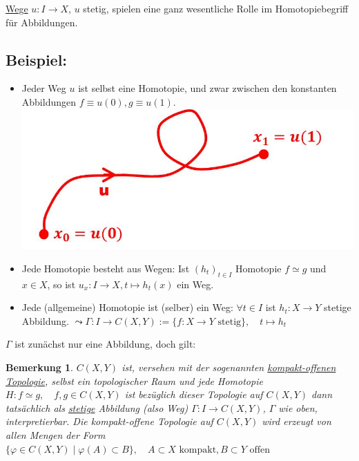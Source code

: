 \documentclass[a4paper,11pt,notitlepage]{report}
\newtheorem{remark}{Bemerkung}[chapter]
\newenvironment{bsp}[1]
{
\setlength{\fboxsep}{10pt}
\subsection*{Beispiel: #1}
\begin{upshape}
}
{
\end{upshape}
}
\begin{document}
\underline{Wege} $u \colon I \rightarrow X$, $u$ stetig, spielen eine ganz wesentliche Rolle im Homotopiebegriff für Abbildungen.

\begin{bsp}{}
	\begin{itemize}
		\item Jeder Weg $u$ ist selbst eine Homotopie, und zwar zwischen den konstanten Abbildungen $f \equiv u(0), g \equiv u(1)$.
			\newline \includegraphics[scale=0.4]{images/Weg_als_Homotopie.jpg}
		\item Jede Homotopie besteht aus Wegen:
			\newline Ist $(h_t)_{t \in I}$ Homotopie $f \simeq g$ und $x \in X$, so ist 
			$u_x \colon I \rightarrow X, t \mapsto h_t(x)$ ein Weg.
		\item Jede (allgemeine) Homotopie ist (selber) ein Weg: \newline
		$\forall t \in I$ ist $h_t \colon X \rightarrow Y$ stetige Abbildung.
		\newline
		$\leadsto \Gamma \colon I \rightarrow C(X,Y) := \{f \colon X \rightarrow Y \text{ stetig}\}, \quad t \mapsto h_t$
	\end{itemize}
	$\Gamma$ ist zunächst nur eine Abbildung, doch gilt:
	\begin{remark}{}
	$C(X,Y)$ ist, versehen mit der sogenannten \underline{kompakt-offenen} \underline{Topologie}, selbst ein topologischer Raum und jede Homotopie $H \colon f \simeq g, \quad f,g \in C(X,Y)$ ist bezüglich dieser Topologie auf $C(X,Y)$ dann tatsächlich als \underline{stetige} Abbildung (also Weg) $\Gamma \colon I \rightarrow C(X,Y)$, $\Gamma$ wie oben, interpretierbar.
\newline
Die kompakt-offene Topologie auf $C(X,Y)$ wird erzeugt von allen Mengen der Form $\{\varphi \in C(X,Y) \mid \varphi(A) \subset B\}, \quad A \subset X \text{ kompakt}, B \subset Y \text{ offen}$
\end{remark}

\end{bsp}
\end{document}
